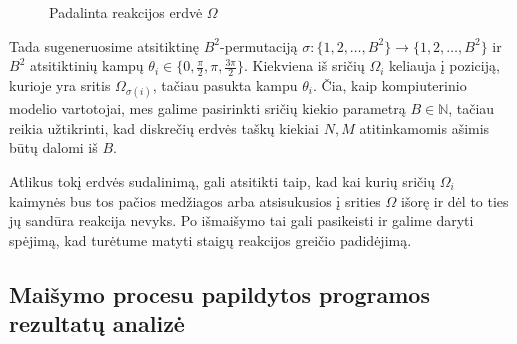 \begin{figure}[!h]
\centering
\caption{Padalinta reakcijos erdvė $\Omega$}
\label{mix-inequality-graphic}

\end{figure}

Tada sugeneruosime atsitiktinę $B^2$-permutaciją $\sigma: \{ 1, 2, \dots, B^2 \} \to \{ 1, 2, \dots, B^2 \} $ ir $B^2$ atsitiktinių kampų $\theta_i \in \{0, \frac{\pi}{2}, \pi, \frac{3\pi}{2}\}$. Kiekviena iš sričių $\Omega_i$ keliauja į poziciją, kurioje yra sritis $\Omega_{\sigma(i)}$, tačiau pasukta kampu $\theta_i$. Čia, kaip kompiuterinio modelio vartotojai, mes galime pasirinkti sričių kiekio parametrą $B\in\mathbb{N}$, tačiau reikia užtikrinti, kad diskrečių erdvės taškų kiekiai $N, M$ atitinkamomis ašimis būtų dalomi iš $B$. 

Atlikus tokį erdvės sudalinimą, gali atsitikti taip, kad kai kurių sričių $\Omega_i$ kaimynės bus tos pačios medžiagos arba atsisukusios į srities $\Omega$ išorę ir dėl to ties jų sandūra reakcija nevyks. Po išmaišymo tai gali pasikeisti ir galime daryti spėjimą, kad turėtume matyti staigų reakcijos greičio padidėjimą. 






\subsection{Maišymo procesu papildytos programos rezultatų analizė}

